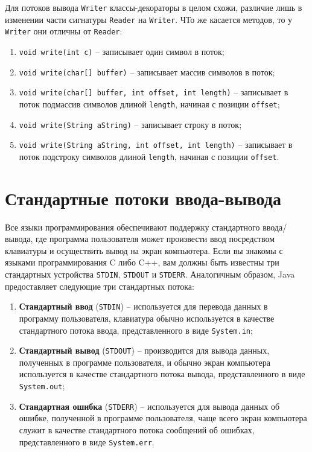 Для потоков вывода \verb|Writer| классы-декораторы в целом схожи, различие лишь в изменении части сигнатуры \verb|Reader| на \verb|Writer|. ЧТо же касается методов, то у \verb|Writer| они отличны от \verb|Reader|:

\begin{enumerate}
    \item \verb|void write(int c)| – записывает один символ в поток;
    \item \verb|void write(char[] buffer)| – записывает массив символов в поток;
    \item \verb|void write(char[] buffer, int offset, int length)| – записывает в поток подмассив символов длиной \verb|length|, начиная с позиции \verb|offset|;
    \item \verb|void write(String aString)| – записывает строку в поток;
    \item \verb|void write(String aString, int offset, int length)| – записывает в поток подстроку символов длиной \verb|length|, начиная с позиции \verb|offset|.
\end{enumerate}

\section{Стандартные потоки ввода-вывода}

Все языки программирования обеспечивают поддержку стандартного ввода/вывода, где программа пользователя может произвести ввод посредством клавиатуры и осуществить вывод на экран компьютера. Если вы знакомы с языками программирования C либо C++, вам должны быть известны три стандартных устройства \verb|STDIN|, \verb|STDOUT| и \verb|STDERR|. Аналогичным образом, Java предоставляет следующие три стандартных потока:

\begin{enumerate}
    \item \textbf{Стандартный ввод} (\verb|STDIN|) – используется для перевода данных в программу пользователя, клавиатура обычно используется в качестве стандартного потока ввода, представленного в виде \verb|System.in|;
    \item \textbf{Стандартный вывод} (\verb|STDOUT|) – производится для вывода данных, полученных в программе пользователя, и обычно экран компьютера используется в качестве стандартного потока вывода, представленного в виде \verb|System.out|;
    \item \textbf{Стандартная ошибка} (\verb|STDERR|) – используется для вывода данных об ошибке, полученной в программе пользователя, чаще всего экран компьютера служит в качестве стандартного потока сообщений об ошибках, представленного в виде \verb|System.err|.
\end{enumerate}

